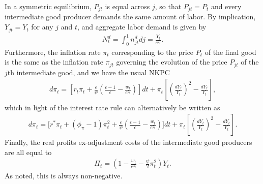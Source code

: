 \documentclass[notitlepage,a4paper,11pt]{report}
\numberwithin{section}{chapter}
\numberwithin{subsection}{section}
\begin{document}
In a symmetric equilibrium, $P_{jt}$ is equal across $j$, so that $P_{jt} = P_t$ and every intermediate good producer demands the same amount of labor. By implication, $Y_{jt} = Y_t$ for any $j$ and $t$, and aggregate labor demand is given by 
\begin{align*}
N_t^d = \int_0^1 n_{jt}^d dj = \frac{Y_t}{e^{z_t}}. 
\end{align*}
Furthermore, the inflation rate $\pi_t$ corresponding to the price $P_t$ of the final good is the same as the inflation rate $\pi_{jt}$ governing the evolution of the price $P_{jt}$ of the $j$th intermediate good, and we have the usual NKPC 
\begin{align*}
d\pi_t = \left[ r_t \pi_t + \frac{\epsilon}{\psi} \left( \frac{\epsilon-1}{\epsilon}- \frac{w_t}{e^{z_t} } \right) \right] dt + \pi_t \left[ \left( \frac{dY_t}{Y_t} \right)^2 - \frac{dY_t}{Y_t} \right], 
\end{align*}
which in light of the interest rate rule can alternatively be written as 
\begin{align*}
d \pi_t = \Bigg[ r^* \pi_t + (\phi_{\pi} -1)\pi_t^2 +  \frac{\epsilon}{\psi} \left( \frac{\epsilon-1}{\epsilon} - \frac{w_t}{e^{z_t}} \right) \Bigg] dt + \pi_t \left[ \left( \frac{dY_t}{Y_t} \right)^2 - \frac{dY_t}{Y_t} \right]. 
\end{align*}
Finally, the real profits ex-adjustment costs of the intermediate good producers are all equal to 
\begin{align*}
\Pi_t = \left( 1 - \frac{w_t}{e^{z_t}} - \frac{\psi}{2} \pi_t^2  \right) Y_t. 
\end{align*}
As noted, this is always non-negative. 


\pagebreak
\end{document}
